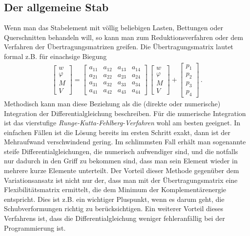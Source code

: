 {\textcolor{sectionTitleBlue}{\subsection{Der allgemeine Stab}}}
Wenn man das Stabelement mit v\"{o}llig beliebigen Lasten, Bettungen oder Querschnitten behandeln will, so kann man zum Reduktionsverfahren oder dem Verfahren der \"{U}bertragungsmatrizen greifen. Die \"{U}bertragungsmatrix lautet formal z.B. f\"{u}r einachsige Biegung
\begin{align}
\left[\begin{array}{c}
  w \\
  \varphi  \\
  M \\
  V
\end{array}\right] = \left[\begin{array}{cccc}
  a_{11} & a_{12} & a_{13} & a_{14} \\
  a_{21} & a_{22} & a_{23} & a_{24} \\
  a_{31} & a_{32} & a_{33} & a_{34} \\
  a_{41} & a_{42} & a_{43} & a_{44}
\end{array} \right] \,\left[\begin{array}{c}
  w \\
  \varphi  \\
  M \\
  V
\end{array}\right] + \left[\begin{array}{c}
  p_1 \\
  p_2 \\
  p_3 \\
  p_4
\end{array}\right]\,.
\end{align}
Methodisch kann man diese Beziehung als die (direkte oder numerische) Integration der Differentialgleichung beschreiben. F\"{u}r die numerische Integration ist das vierstufige {\em Runge-Kutta-Fehlberg-Verfahren\/} wohl am besten geeignet. In einfachen F\"{a}llen ist die L\"{o}sung bereits im ersten Schritt exakt, dann ist der Mehraufwand verschwindend gering. Im schlimmsten Fall erh\"{a}lt man sogenannte steife Differentialgleichungen, die numerisch aufwendiger sind, und die notfalls nur dadurch in den Griff zu bekommen sind, dass man sein Element wieder in mehrere kurze Elemente unterteilt. Der Vorteil dieser Methode gegen\"{u}ber dem Variationsansatz ist nicht nur der, dass man mit der \"{U}bertragungsmatrix eine Flexibilit\"{a}tsmatrix ermittelt, die dem Minimum der Komplement\"{a}renergie entspricht. Dies ist z.B. ein wichtiger Pluspunkt, wenn es darum geht, die Schubverformungen richtig zu ber\"{u}cksichtigen. Ein weiterer Vorteil dieses Verfahrens ist, dass die Differentialgleichung weniger fehleranf\"{a}llig bei der Programmierung ist.

